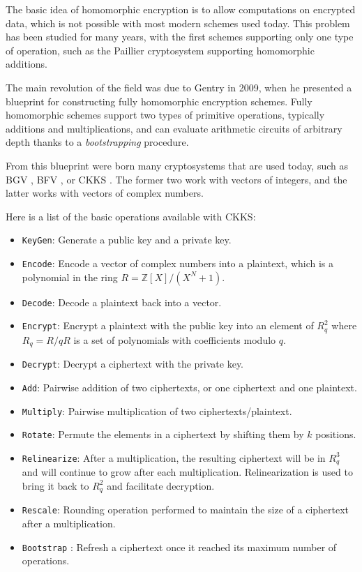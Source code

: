 \documentclass[a4paper,11pt,oneside]{report}
\begin{document}
The basic idea of homomorphic encryption is to allow computations on encrypted data, which is not possible with most modern schemes used today. This problem has been studied for many years, with the first schemes supporting only one type of operation, such as the Paillier \cite{paillier_public-key_1999} cryptosystem supporting homomorphic additions. 

The main revolution of the field was due to Gentry \cite{gentry_fully_2009} in 2009, when he presented a blueprint for constructing fully homomorphic encryption schemes. Fully homomorphic schemes support two types of primitive operations, typically additions and multiplications, and can evaluate arithmetic circuits of arbitrary depth thanks to a \emph{bootstrapping} procedure.

From this blueprint were born many cryptosystems that are used today, such as BGV \cite{brakerski_leveled_2012}, BFV \cite{fan_somewhat_2012}, or CKKS \cite{cheon_homomorphic_2016, cheon_full_2018}. The former two work with vectors of integers, and the latter works with vectors of complex numbers.

Here is a list of the basic operations available with CKKS:
\begin{itemize}
    \item \texttt{KeyGen}: Generate a public key and a private key.
    \item \texttt{Encode}: Encode a vector of complex numbers into a plaintext, which is a polynomial in the ring $R = \mathbb{Z}[X]/(X^N + 1)$.
    \item \texttt{Decode}: Decode a plaintext back into a vector.
    \item \texttt{Encrypt}: Encrypt a plaintext with the public key into an element of $R_q^2$ where $R_q = R/qR$ is a set of polynomials with coefficients modulo $q$.
    \item \texttt{Decrypt}: Decrypt a ciphertext with the private key.
    \item \texttt{Add}: Pairwise addition of two ciphertexts, or one ciphertext and one plaintext.
    \item \texttt{Multiply}: Pairwise multiplication of two ciphertexts/plaintext.
    \item \texttt{Rotate}: Permute the elements in a ciphertext by shifting them by $k$ positions.
    \item \texttt{Relinearize}: After a multiplication, the resulting ciphertext will be in $R_q^3$ and will continue to grow after each multiplication. Relinearization is used to bring it back to $R_q^2$ and facilitate decryption.
    \item \texttt{Rescale}: Rounding operation performed to maintain the size of a ciphertext after a multiplication.
    \item \texttt{Bootstrap} \cite{nielsen_bootstrapping_2018}: Refresh a ciphertext once it reached its maximum number of operations.
\end{itemize}
\end{document}

